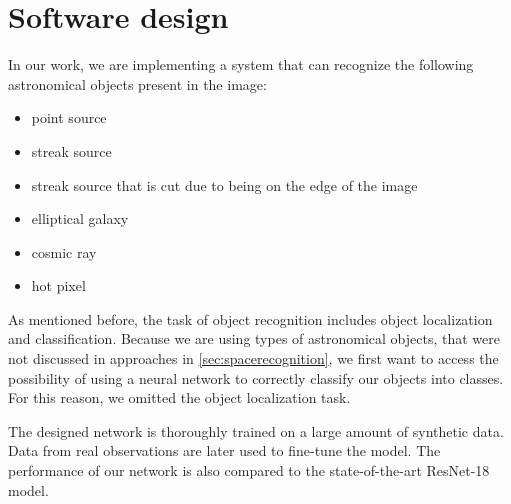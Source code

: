 \chapter{Software design} \label{chap:softwaredesign}

In our work, we are implementing a system that can recognize the following astronomical objects present in the image: 

\begin{itemize}
    \item point source
    \item streak source
    \item streak source that is cut due to being on the edge of the image
    \item elliptical galaxy
    \item cosmic ray
    \item hot pixel
\end{itemize}

As mentioned before, the task of object recognition includes object localization and classification. Because we are using types of astronomical objects, that were not discussed in approaches in \ref{sec:spacerecognition}, we first want to access the possibility of using a neural network to correctly classify our objects into classes. For this reason, we omitted the object localization task. 

The designed network is thoroughly trained on a large amount of synthetic data. Data from real observations are later used to fine-tune the model. The performance of our network is also compared to the state-of-the-art ResNet-18 model. 










